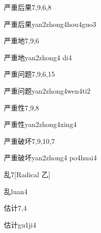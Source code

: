 \begin{entry}{严重后果}{7,9,6,8}
  \begin{phonetics}{严重后果}{yan2zhong4hou4guo3}
  \end{phonetics}
\end{entry}

\begin{entry}{严重地}{7,9,6}
  \begin{phonetics}{严重地}{yan2zhong4 di4}
  \end{phonetics}
\end{entry}

\begin{entry}{严重问题}{7,9,6,15}
  \begin{phonetics}{严重问题}{yan2zhong4wen4ti2}
  \end{phonetics}
\end{entry}

\begin{entry}{严重性}{7,9,8}
  \begin{phonetics}{严重性}{yan2zhong4xing4}
  \end{phonetics}
\end{entry}

\begin{entry}{严重破坏}{7,9,10,7}
  \begin{phonetics}{严重破坏}{yan2zhong4 po4huai4}
  \end{phonetics}
\end{entry}

\begin{entry}{乱}{7}[Radical 乙]
  \begin{phonetics}{乱}{luan4}
  \end{phonetics}
\end{entry}

\begin{entry}{估计}{7,4}
  \begin{phonetics}{估计}{gu1ji4}
  \end{phonetics}
\end{entry}

